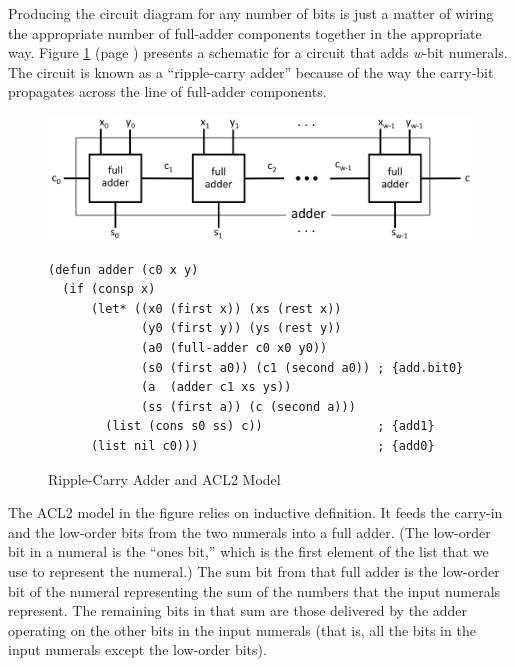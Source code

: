 Producing the circuit diagram for any number of bits
is just a matter of wiring the appropriate number of
full-adder components together in the appropriate way.
Figure \ref{fig:adder} (page \pageref{fig:adder}) presents a schematic
for a circuit that adds \emph{w}-bit numerals.
The circuit is known as a ``ripple-carry adder'' because
of the way the carry-bit propagates across the line
of full-adder components.

\begin{figure}
\begin{center}
\includegraphics[scale=0.25]{Images/adder.png}
\begin{Verbatim}
(defun adder (c0 x y)
  (if (consp x)
      (let* ((x0 (first x)) (xs (rest x))
             (y0 (first y)) (ys (rest y))
             (a0 (full-adder c0 x0 y0))
             (s0 (first a0)) (c1 (second a0)) ; {add.bit0}
             (a  (adder c1 xs ys))
             (ss (first a)) (c (second a)))
        (list (cons s0 ss) c))                ; {add1}
      (list nil c0)))                         ; {add0}
\end{Verbatim}
\end{center}
\caption{Ripple-Carry Adder and ACL2 Model}
\label{fig:adder}
\end{figure}

The ACL2 model in the figure relies
on inductive definition. It feeds the carry-in and
the low-order bits from the two numerals into a full adder.
(The low-order bit in a numeral is the ``ones bit,''
which is the first element of the list that we use to
represent the numeral.)
The sum bit from that full adder
is the low-order bit of the numeral representing the sum of
the numbers that the input numerals represent.
The remaining bits in that sum are those delivered by
the adder operating on the other bits in the input numerals
(that is, all the bits in the input numerals except the low-order bits).

